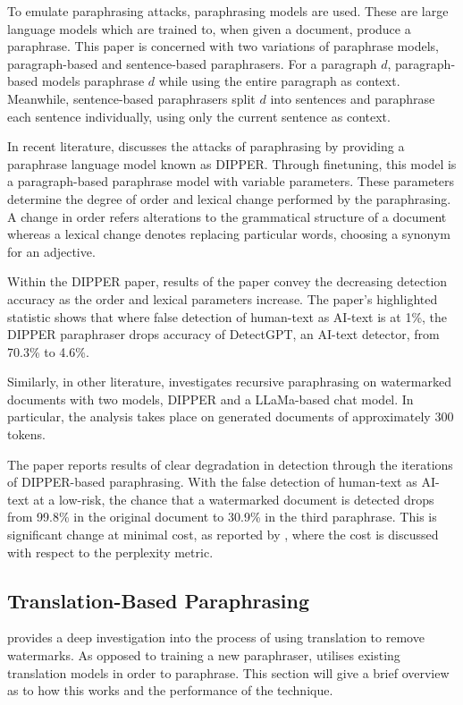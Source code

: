 \documentclass{l4proj}
\theoremstyle{definition}
\begin{document}
        To emulate paraphrasing attacks, paraphrasing models are used. These are large language models which are trained to, when given a document, produce a paraphrase. This paper is concerned with two variations of paraphrase models, paragraph-based and sentence-based paraphrasers. For a paragraph $d$, paragraph-based models paraphrase $d$ while using the entire paragraph as context. Meanwhile, sentence-based paraphrasers split $d$ into sentences and paraphrase each sentence individually, using only the current sentence as context.

        In recent literature, \citet{krishna2023paraphrasing} discusses the attacks of paraphrasing by providing a paraphrase language model known as DIPPER. Through finetuning, this model is a paragraph-based paraphrase model with variable parameters. These parameters determine the degree of order and lexical change performed by the paraphrasing. A change in order refers alterations to the grammatical structure of a document whereas a lexical change denotes replacing particular words, choosing a synonym for an adjective.

        Within the DIPPER paper, results of the paper convey the decreasing detection accuracy as the order and lexical parameters increase. The paper's highlighted statistic shows that where false detection of human-text as AI-text is at 1\%, the DIPPER paraphraser drops accuracy of DetectGPT, an AI-text detector, from 70.3\% to 4.6\%.

        Similarly, in other literature, \citet{sadasivan2023aigenerated} investigates recursive paraphrasing on watermarked documents with two models, DIPPER and a LLaMa-based chat model. In particular, the analysis takes place on generated documents of approximately 300 tokens. 

        The paper reports results of clear degradation in detection through the iterations of DIPPER-based paraphrasing. With the false detection of human-text as AI-text at a low-risk, the chance that a watermarked document is detected drops from 99.8\% in the original document to 30.9\% in the third paraphrase. This is significant change at minimal cost, as reported by \citet{sadasivan2023aigenerated}, where the cost is discussed with respect to the perplexity metric. 

    \subsection{Translation-Based Paraphrasing}
        \citet{he2024watermarks} provides a deep investigation into the process of using translation to remove watermarks. As opposed to training a new paraphraser, \citet{he2024watermarks} utilises existing translation models in order to paraphrase. This section will give a brief overview as to how this works and the performance of the technique. 
\end{document}
